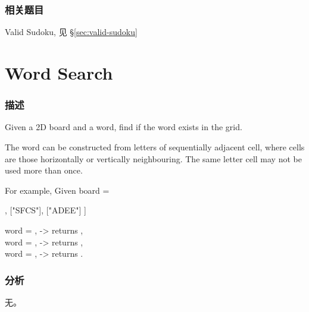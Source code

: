 \subsubsection{相关题目}
\begindot
\item Valid Sudoku, 见 \S \ref{sec:valid-sudoku}
\myenddot


\section{Word Search} %
\label{sec:word-search}


\subsubsection{描述}
Given a 2D board and a word, find if the word exists in the grid.

The word can be constructed from letters of sequentially adjacent cell, where  cells are those horizontally or vertically neighbouring. The same letter cell may not 
be used more than once.

For example,
Given board =
\begin{Code}
	[
	["ABCE"],
	["SFCS"],
	["ADEE"]
	]
\end{Code}
word = , -> returns ,\\
word = , -> returns ,\\
word = , -> returns .


\subsubsection{分析}
无。


